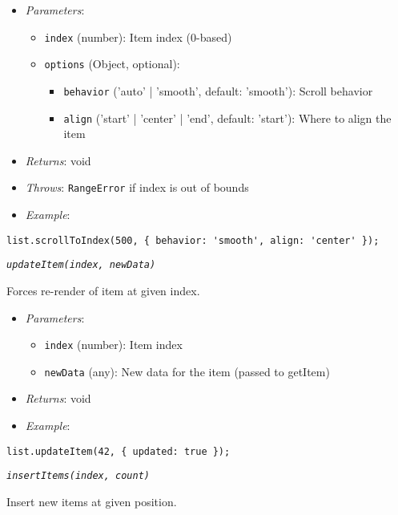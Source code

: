 \documentclass[11pt]{article}
\begin{document}
\begin{itemize}
\item \emph{Parameters}:
\begin{itemize}
\item \texttt{index} (number): Item index (0-based)
\item \texttt{options} (Object, optional):
\begin{itemize}
\item \texttt{behavior} ('auto' | 'smooth', default: 'smooth'): Scroll behavior
\item \texttt{align} ('start' | 'center' | 'end', default: 'start'): Where to align the item
\end{itemize}
\end{itemize}

\item \emph{Returns}: void

\item \emph{Throws}: \texttt{RangeError} if index is out of bounds

\item \emph{Example}:
\end{itemize}
\begin{verbatim}
list.scrollToIndex(500, { behavior: 'smooth', align: 'center' });
\end{verbatim}

\emph{\texttt{updateItem(index, newData)}}

Forces re-render of item at given index.

\begin{itemize}
\item \emph{Parameters}:
\begin{itemize}
\item \texttt{index} (number): Item index
\item \texttt{newData} (any): New data for the item (passed to getItem)
\end{itemize}

\item \emph{Returns}: void

\item \emph{Example}:
\end{itemize}
\begin{verbatim}
list.updateItem(42, { updated: true });
\end{verbatim}

\emph{\texttt{insertItems(index, count)}}

Insert new items at given position.
\end{document}

